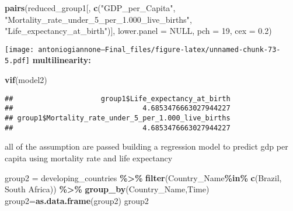 \documentclass[
]{article}
\newenvironment{Shaded}{\begin{snugshade}}{\end{snugshade}}
\newcommand{\AttributeTok}[1]{\textcolor[rgb]{0.13,0.29,0.53}{#1}}
\newcommand{\ConstantTok}[1]{\textcolor[rgb]{0.56,0.35,0.01}{#1}}
\newcommand{\DecValTok}[1]{\textcolor[rgb]{0.00,0.00,0.81}{#1}}
\newcommand{\FloatTok}[1]{\textcolor[rgb]{0.00,0.00,0.81}{#1}}
\newcommand{\FunctionTok}[1]{\textcolor[rgb]{0.13,0.29,0.53}{\textbf{#1}}}
\newcommand{\NormalTok}[1]{#1}
\newcommand{\OtherTok}[1]{\textcolor[rgb]{0.56,0.35,0.01}{#1}}
\newcommand{\SpecialCharTok}[1]{\textcolor[rgb]{0.81,0.36,0.00}{\textbf{#1}}}
\newcommand{\StringTok}[1]{\textcolor[rgb]{0.31,0.60,0.02}{#1}}
\begin{document}
\begin{Shaded}
\begin{Highlighting}[]
\FunctionTok{pairs}\NormalTok{(reduced\_group1[, }\FunctionTok{c}\NormalTok{(}\StringTok{"GDP\_per\_Capita"}\NormalTok{, }\StringTok{"Mortality\_rate\_under\_5\_per\_1.000\_live\_births"}\NormalTok{, }\StringTok{"Life\_expectancy\_at\_birth"}\NormalTok{)], }\AttributeTok{lower.panel =} \ConstantTok{NULL}\NormalTok{, }\AttributeTok{pch =} \DecValTok{19}\NormalTok{, }\AttributeTok{cex =} \FloatTok{0.2}\NormalTok{)}
\end{Highlighting}
\end{Shaded}

\texttt{[image: antoniogiannone---Final\_files/figure-latex/unnamed-chunk-73-5.pdf]}
\textbf{multilinearity:}

\begin{Shaded}
\begin{Highlighting}[]
\FunctionTok{vif}\NormalTok{(model2)}
\end{Highlighting}
\end{Shaded}

\begin{verbatim}
##                     group1$Life_expectancy_at_birth 
##                               4.6853476663027944227 
## group1$Mortality_rate_under_5_per_1.000_live_births 
##                               4.6853476663027944227
\end{verbatim}

all of the assumption are passed building a regression model to predict
gdp per capita using mortality rate and life expectancy

\begin{Shaded}
\begin{Highlighting}[]
\NormalTok{group2 }\OtherTok{=}\NormalTok{ developing\_countries }\SpecialCharTok{\%\textgreater{}\%}
  \FunctionTok{filter}\NormalTok{(Country\_Name}\SpecialCharTok{\%in\%} \FunctionTok{c}\NormalTok{(}\StringTok{\textquotesingle{}Brazil\textquotesingle{}}\NormalTok{, }\StringTok{\textquotesingle{}South Africa\textquotesingle{}}\NormalTok{)) }\SpecialCharTok{\%\textgreater{}\%}
  \FunctionTok{group\_by}\NormalTok{(Country\_Name,Time)}
\NormalTok{group2}\OtherTok{=}\FunctionTok{as.data.frame}\NormalTok{(group2)}
\NormalTok{group2}
\end{Highlighting}
\end{Shaded}
\end{document}
